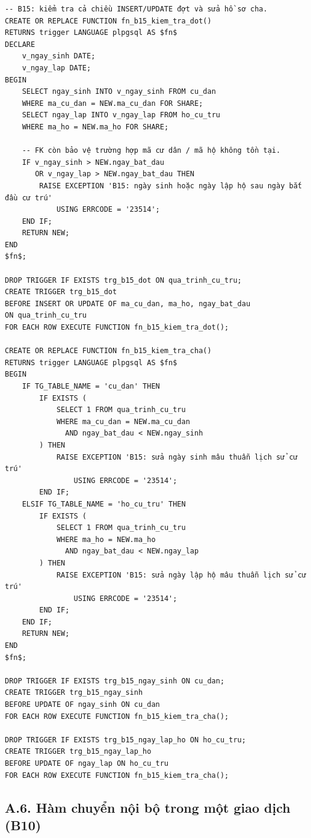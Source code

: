 \begin{lstlisting}[style=sqlvn, caption={Trigger kiểm tra ngày hợp lý (B15)}, label={lst:pl_b15}]
-- B15: kiểm tra cả chiều INSERT/UPDATE đợt và sửa hồ sơ cha.
CREATE OR REPLACE FUNCTION fn_b15_kiem_tra_dot()
RETURNS trigger LANGUAGE plpgsql AS $fn$
DECLARE
    v_ngay_sinh DATE;
    v_ngay_lap DATE;
BEGIN
    SELECT ngay_sinh INTO v_ngay_sinh FROM cu_dan
    WHERE ma_cu_dan = NEW.ma_cu_dan FOR SHARE;
    SELECT ngay_lap INTO v_ngay_lap FROM ho_cu_tru
    WHERE ma_ho = NEW.ma_ho FOR SHARE;

    -- FK còn bảo vệ trường hợp mã cư dân / mã hộ không tồn tại.
    IF v_ngay_sinh > NEW.ngay_bat_dau
       OR v_ngay_lap > NEW.ngay_bat_dau THEN
        RAISE EXCEPTION 'B15: ngày sinh hoặc ngày lập hộ sau ngày bắt đầu cư trú'
            USING ERRCODE = '23514';
    END IF;
    RETURN NEW;
END
$fn$;

DROP TRIGGER IF EXISTS trg_b15_dot ON qua_trinh_cu_tru;
CREATE TRIGGER trg_b15_dot
BEFORE INSERT OR UPDATE OF ma_cu_dan, ma_ho, ngay_bat_dau
ON qua_trinh_cu_tru
FOR EACH ROW EXECUTE FUNCTION fn_b15_kiem_tra_dot();

CREATE OR REPLACE FUNCTION fn_b15_kiem_tra_cha()
RETURNS trigger LANGUAGE plpgsql AS $fn$
BEGIN
    IF TG_TABLE_NAME = 'cu_dan' THEN
        IF EXISTS (
            SELECT 1 FROM qua_trinh_cu_tru
            WHERE ma_cu_dan = NEW.ma_cu_dan
              AND ngay_bat_dau < NEW.ngay_sinh
        ) THEN
            RAISE EXCEPTION 'B15: sửa ngày sinh mâu thuẫn lịch sử cư trú'
                USING ERRCODE = '23514';
        END IF;
    ELSIF TG_TABLE_NAME = 'ho_cu_tru' THEN
        IF EXISTS (
            SELECT 1 FROM qua_trinh_cu_tru
            WHERE ma_ho = NEW.ma_ho
              AND ngay_bat_dau < NEW.ngay_lap
        ) THEN
            RAISE EXCEPTION 'B15: sửa ngày lập hộ mâu thuẫn lịch sử cư trú'
                USING ERRCODE = '23514';
        END IF;
    END IF;
    RETURN NEW;
END
$fn$;

DROP TRIGGER IF EXISTS trg_b15_ngay_sinh ON cu_dan;
CREATE TRIGGER trg_b15_ngay_sinh
BEFORE UPDATE OF ngay_sinh ON cu_dan
FOR EACH ROW EXECUTE FUNCTION fn_b15_kiem_tra_cha();

DROP TRIGGER IF EXISTS trg_b15_ngay_lap_ho ON ho_cu_tru;
CREATE TRIGGER trg_b15_ngay_lap_ho
BEFORE UPDATE OF ngay_lap ON ho_cu_tru
FOR EACH ROW EXECUTE FUNCTION fn_b15_kiem_tra_cha();
\end{lstlisting}

\subsection*{A.6. Hàm chuyển nội bộ trong một giao dịch (B10)}

